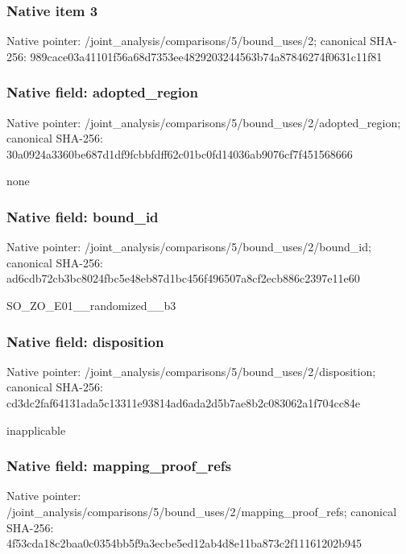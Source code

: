 \documentclass[10pt,a4paper]{article}
\begin{document}
\subsubsection{Native item 3}
Native pointer: /joint\_\allowbreak{}analysis/comparisons/5/bound\_\allowbreak{}uses/2; canonical SHA-256: 989cace03a41101f56a68d7353ee4829203244563b74a87846274f0631c11f81

\subsubsection{Native field: adopted\_\allowbreak{}region}
Native pointer: /joint\_\allowbreak{}analysis/comparisons/5/bound\_\allowbreak{}uses/2/adopted\_\allowbreak{}region; canonical SHA-256: 30a0924a3360be687d1df9fcbbfdff62c01bc0fd14036ab9076cf7f451568666

\begingroup\raggedright\sloppy none\par\endgroup

\subsubsection{Native field: bound\_\allowbreak{}id}
Native pointer: /joint\_\allowbreak{}analysis/comparisons/5/bound\_\allowbreak{}uses/2/bound\_\allowbreak{}id; canonical SHA-256: ad6cdb72cb3bc8024fbc5e48eb87d1bc456f496507a8cf2ecb886c2397e11e60

\begingroup\raggedright\sloppy SO\_\allowbreak{}ZO\_\allowbreak{}E01\_\allowbreak{}\_\allowbreak{}randomized\_\allowbreak{}\_\allowbreak{}b3\par\endgroup

\subsubsection{Native field: disposition}
Native pointer: /joint\_\allowbreak{}analysis/comparisons/5/bound\_\allowbreak{}uses/2/disposition; canonical SHA-256: cd3dc2faf64131ada5c13311e93814ad6ada2d5b7ae8b2c083062a1f704cc84e

\begingroup\raggedright\sloppy inapplicable\par\endgroup

\subsubsection{Native field: mapping\_\allowbreak{}proof\_\allowbreak{}refs}
Native pointer: /joint\_\allowbreak{}analysis/comparisons/5/bound\_\allowbreak{}uses/2/mapping\_\allowbreak{}proof\_\allowbreak{}refs; canonical SHA-256: 4f53cda18c2baa0c0354bb5f9a3ecbe5ed12ab4d8e11ba873c2f11161202b945
\end{document}
